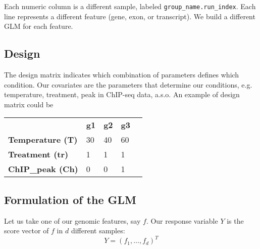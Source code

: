\documentclass[a4paper,11pt]{article}
\begin{document}
Each numeric column is a different sample, labeled \texttt{group\_name.run\_index}. Each line represents a different feature (gene, exon, or transcript). We build a different GLM for each feature.

\subsection{Design}
The design matrix indicates which combination of parameters defines which condition. Our covariates are the parameters that determine our conditions, e.g. temperature, treatment, peak in ChIP-seq data, a.s.o. An example of design matrix could be

\vspace{0.5 cm}
\begin{tabular}{lllll}
                            & \textbf{g1} & \textbf{g2} & \textbf{g3}\\
\textbf{Temperature (T)}    & 30       & 40       & 60 \\
\textbf{Treatment (tr)}     & 1        & 1        & 1  \\
\textbf{ChIP\_peak (Ch)}    & 0        & 0        & 1
\end{tabular}
\vspace{0.5 cm}

\subsection{Formulation of the GLM}

Let us take one of our genomic features, say $f$. Our response variable $Y$ is the score vector of $f$ in $d$ different samples:
$$ Y = (f_1,\ldots,f_d)^T $$
\end{document}
